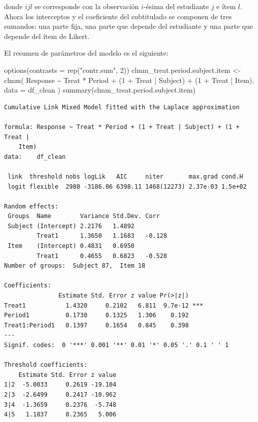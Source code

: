 \documentclass[
  12pt,
  a4paper,
  extrafontsizes,
  onecolumn,
  openright,
  table]{memoir}
\newenvironment{Shaded}{\begin{snugshade}}{\end{snugshade}}
\newcommand{\AttributeTok}[1]{\textcolor[rgb]{0.40,0.45,0.13}{#1}}
\newcommand{\DecValTok}[1]{\textcolor[rgb]{0.68,0.00,0.00}{#1}}
\newcommand{\FunctionTok}[1]{\textcolor[rgb]{0.28,0.35,0.67}{#1}}
\newcommand{\NormalTok}[1]{\textcolor[rgb]{0.00,0.23,0.31}{#1}}
\newcommand{\OtherTok}[1]{\textcolor[rgb]{0.00,0.23,0.31}{#1}}
\newcommand{\SpecialCharTok}[1]{\textcolor[rgb]{0.37,0.37,0.37}{#1}}
\newcommand{\StringTok}[1]{\textcolor[rgb]{0.13,0.47,0.30}{#1}}
\begin{document}
\normalsize

donde \(ijl\) se corresponde con la observación \(i\)-ésima del
estudiante \(j\) e ítem \(l\). Ahora los interceptos y el coeficiente
del subtitulado se componen de tres sumandos: una parte fija, una parte
que depende del estudiante y una parte que depende del ítem de Likert.

El resumen de parámetros del modelo es el siguiente:

\scriptsize

\begin{Shaded}
\begin{Highlighting}[]
\FunctionTok{options}\NormalTok{(}\AttributeTok{contrasts =} \FunctionTok{rep}\NormalTok{(}\StringTok{"contr.sum"}\NormalTok{, }\DecValTok{2}\NormalTok{))}
\NormalTok{clmm\_treat.period.subject.item }\OtherTok{\textless{}{-}} \FunctionTok{clmm}\NormalTok{(}
\NormalTok{    Response }\SpecialCharTok{\textasciitilde{}}\NormalTok{ Treat }\SpecialCharTok{*}\NormalTok{ Period }\SpecialCharTok{+}\NormalTok{ (}\DecValTok{1} \SpecialCharTok{+}\NormalTok{ Treat }\SpecialCharTok{|}\NormalTok{ Subject) }\SpecialCharTok{+}\NormalTok{ (}\DecValTok{1} \SpecialCharTok{+}\NormalTok{ Treat }\SpecialCharTok{|}\NormalTok{ Item),}
    \AttributeTok{data =}\NormalTok{ df\_clean}
\NormalTok{)}
\FunctionTok{summary}\NormalTok{(clmm\_treat.period.subject.item)}
\end{Highlighting}
\end{Shaded}

\begin{verbatim}
Cumulative Link Mixed Model fitted with the Laplace approximation

formula: Response ~ Treat * Period + (1 + Treat | Subject) + (1 + Treat |  
    Item)
data:    df_clean

 link  threshold nobs logLik   AIC     niter       max.grad cond.H 
 logit flexible  2980 -3186.06 6398.11 1468(12273) 2.37e-03 1.5e+02

Random effects:
 Groups  Name        Variance Std.Dev. Corr   
 Subject (Intercept) 2.2176   1.4892          
         Treat1      1.3650   1.1683   -0.128 
 Item    (Intercept) 0.4831   0.6950          
         Treat1      0.4655   0.6823   -0.528 
Number of groups:  Subject 87,  Item 18 

Coefficients:
               Estimate Std. Error z value Pr(>|z|)    
Treat1           1.4320     0.2102   6.811  9.7e-12 ***
Period1          0.1730     0.1325   1.306    0.192    
Treat1:Period1   0.1397     0.1654   0.845    0.398    
---
Signif. codes:  0 '***' 0.001 '**' 0.01 '*' 0.05 '.' 0.1 ' ' 1

Threshold coefficients:
    Estimate Std. Error z value
1|2  -5.0033     0.2619 -19.104
2|3  -2.6499     0.2417 -10.962
3|4  -1.3659     0.2376  -5.748
4|5   1.1837     0.2365   5.006
\end{verbatim}
\end{document}
